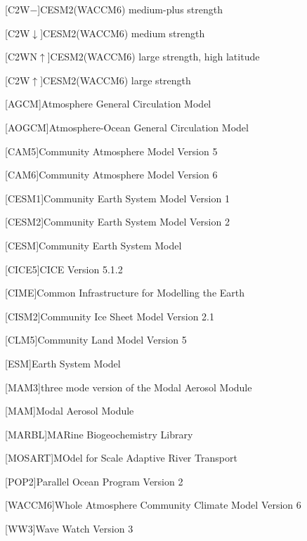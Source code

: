 \documentclass{ametsocV5}
\begin{document}
\begin{acronym}[AODVISstdn]
  [C2W\(-\)]{CESM2(WACCM6) medium-plus strength}

  [C2W\(\downarrow\)]{CESM2(WACCM6) medium strength}

  [C2WN\(\uparrow\)]{CESM2(WACCM6) large strength, high latitude}

  [C2W\(\uparrow\)]{CESM2(WACCM6) large strength}

  [AGCM]{Atmosphere General Circulation Model}

  [AOGCM]{Atmosphere-Ocean General Circulation Model}

  [CAM5]{Community Atmosphere Model Version 5}

  [CAM6]{Community Atmosphere Model Version 6}

  [CESM1]{Community Earth System Model Version 1}

  [CESM2]{Community Earth System Model Version 2}

  [CESM]{Community Earth System Model}

  [CICE5]{CICE Version 5.1.2}

  [CIME]{Common Infrastructure for Modelling the Earth}

  [CISM2]{Community Ice Sheet Model Version 2.1}

  [CLM5]{Community Land Model Version 5}

  [ESM]{Earth System Model}

  [MAM3]{three mode version of the Modal Aerosol Module}

  [MAM]{Modal Aerosol Module}

  [MARBL]{MARine Biogeochemistry Library}

  [MOSART]{MOdel for Scale Adaptive River Transport}

  [POP2]{Parallel Ocean Program Version 2}

  [WACCM6]{Whole Atmosphere Community Climate Model Version 6}

  [WW3]{Wave Watch Version 3}

\end{acronym}
\end{document}

